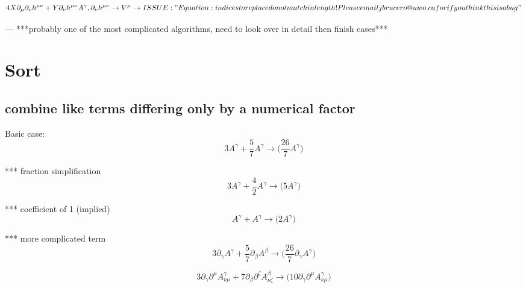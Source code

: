 \documentclass{article}
\def\){\Big)}
\def\({\Big(}
\begin{document}
{\color{red}
\begin{equation}
4X \partial_{\mu} \partial_{\nu}h^{\mu \nu} +Y \partial_{\nu}h^{\mu \nu} A^{\gamma} ,  \partial_{\nu}h^{\mu \nu} \rightarrow  V^{\mu} \rightarrow ISSUE:" Equation: indices to replace do not match in length!
Please email jbrucero@uwo.ca for if you think this is a bug"
\end{equation}
}


— ***probably one of the most complicated algorithms, need to look over in detail then finish cases***\\









\section{Sort}
\subsection{ combine like terms differing only by a numerical factor}

Basic case:
\begin{equation}
3A^{\gamma} + \frac{5}{7} A^{\gamma} \rightarrow 
\(\frac{26}{7} A^{\gamma} \)
\end{equation}

*** fraction simplification
\begin{equation}
3A^{\gamma} + \frac{4}{2} A^{\gamma}  \rightarrow 
\(5 A^{\gamma} \)
\end{equation}

*** coefficient of 1 (implied)
\begin{equation}
A^{\gamma} + A^{\gamma} \rightarrow 
\(2 A^{\gamma} \)
\end{equation}

*** more complicated term
\begin{equation}
3\partial_{\gamma}A^{\gamma} + \frac{5}{7} \partial_{\beta}A^{\beta} \rightarrow 
\(\frac{26}{7} \partial_{\gamma}A^{\gamma} \)
\end{equation}

\begin{equation}
3\partial_{\gamma}\partial^{\mu}A^{\gamma}_{\nu \mu} + 7 \partial_{\beta}\partial^{\zeta}A^{\beta}_{\nu \zeta} \rightarrow 
 \(10 \partial_{\gamma}\partial^{\mu}A_{\nu \mu}^{\gamma} \)
\end{equation}
\end{document}
